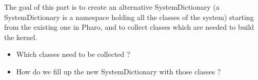 %
%
%
%

\goal
The goal of this part is to create an alternative SystemDictionary (a SystemDictionary is a namespace holding all the classes of the system) starting from the existing one in \gls{Pharo}, and to collect classes which are needed to build the kernel. 

\problems
\begin{itemize}
	\item Which classes need to be collected ?
	\item How do we fill up the new SystemDictionary with those classes ?
\end{itemize}

